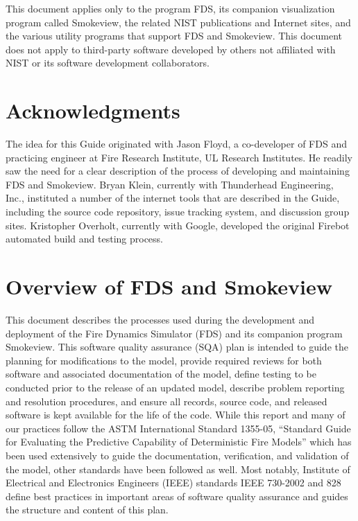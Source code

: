 \documentclass[11pt]{book}
\begin{document}
This document applies only to the program FDS, its companion visualization program called Smokeview, the related NIST publications and Internet
sites, and the various utility programs that support FDS and Smokeview. This document does not apply to third-party software developed by others
not affiliated with NIST or its software development collaborators.





\chapter{Acknowledgments}

\label{acksection}

The idea for this Guide originated with Jason Floyd, a co-developer of FDS and practicing engineer at Fire Research Institute, UL Research Institutes. He readily saw the need for a clear description of the process of developing and maintaining FDS and Smokeview. Bryan Klein, currently with Thunderhead Engineering, Inc., instituted a number of the internet tools that are described in the Guide, including the source code repository, issue tracking system, and discussion group sites. Kristopher Overholt, currently with Google, developed the original Firebot automated build and testing process.


\cleardoublepage
{}
{}
\tableofcontents

\mainmatter


\chapter{Overview of FDS and Smokeview}

This document describes the processes used during the development and deployment of the Fire Dynamics Simulator (FDS) and its companion program Smokeview.  This software quality assurance (SQA) plan is intended to guide the planning for modifications to the model, provide required reviews for both software and associated documentation of the model, define testing to be conducted prior to the release of an updated model, describe problem reporting and resolution procedures, and ensure all records, source code, and released software is kept available for the life of the code.  While this report and many of our practices follow the ASTM International Standard 1355-05, ``Standard Guide for Evaluating the Predictive Capability of Deterministic Fire Models'' \cite{ASTM:E1355} which has been used extensively to guide the documentation, verification, and validation of the model, other standards have been followed as well.  Most notably, Institute of Electrical and Electronics Engineers (IEEE) standards IEEE 730-2002 \cite{IEEE:730} and 828~\cite{IEEE-828} define best practices in important areas of software quality assurance and guides the structure and content of this plan.
\end{document}
